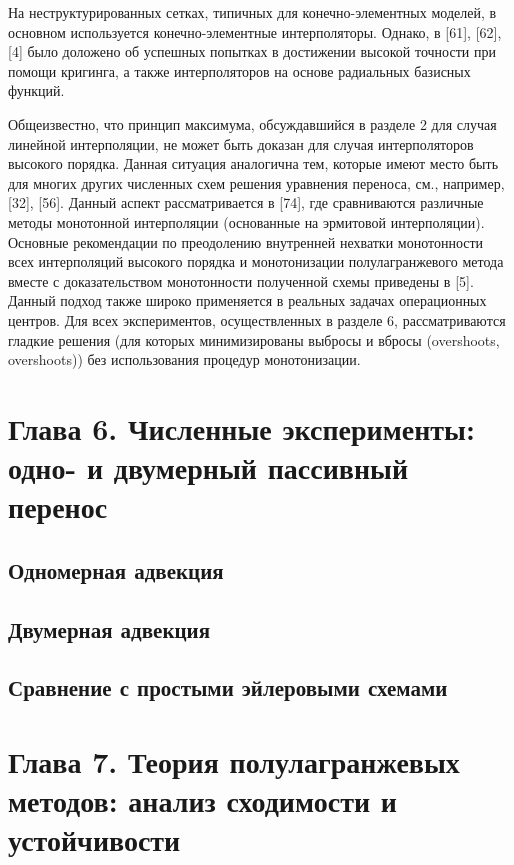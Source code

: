 На неструктурированных сетках, типичных для конечно-элементных моделей, в основном используется конечно-элементные интерполяторы. Однако, в [61], [62], [4] было доложено об успешных попытках в достижении высокой точности при помощи кригинга, а также интерполяторов на основе радиальных базисных функций.


Общеизвестно, что принцип максимума, обсуждавшийся в разделе 2 для случая линейной интерполяции, не может быть доказан для случая интерполяторов высокого порядка. Данная ситуация аналогична тем, которые имеют место быть для многих других численных схем решения уравнения переноса, см., например, [32], [56]. Данный аспект рассматривается в [74], где сравниваются различные методы монотонной интерполяции (основанные на эрмитовой интерполяции). Основные рекомендации по преодолению внутренней нехватки монотонности всех интерполяций высокого порядка и монотонизации полулагранжевого метода вместе с доказательством монотонности полученной схемы приведены в [5]. Данный подход также широко применяется в реальных задачах операционных центров.
Для всех экспериментов, осуществленных в разделе 6, рассматриваются гладкие решения (для которых минимизированы выбросы и вбросы (overshoots, overshoots)) без использования процедур монотонизации.
\chapter*{Глава 6. Численные эксперименты: одно- и двумерный пассивный перенос} \label{chapt_6}
\section*{Одномерная адвекция} \label{sect6_1}
\section*{Двумерная адвекция} \label{sect6_2}
\section*{Сравнение с простыми эйлеровыми схемами} \label{sect6_3}
\chapter*{Глава 7. Теория полулагранжевых методов: анализ сходимости и устойчивости} \label{chapt_7}
